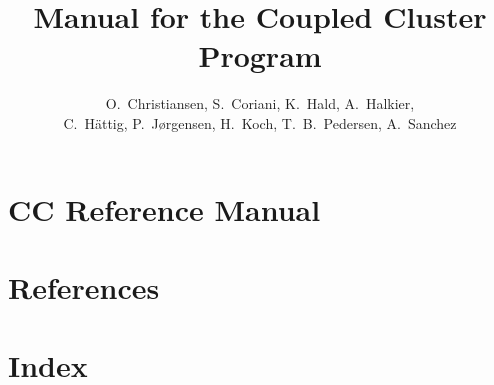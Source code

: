 \documentclass[12pt]{report}
\begin{document}
%

%


\title{Manual for the Coupled Cluster Program}

\author{
O.~Christiansen,
S.~Coriani, 
K.~Hald,
A.~Halkier,
\\
C.~H{\"a}ttig, 
P.~J{\o}rgensen,
H.~Koch, 
T.~B.~Pedersen,
A.~Sanchez
}  

\maketitle

\tableofcontents


% 

%
%
% 
% 
%
%

% 
%
%
%
%
\part{CC Reference Manual}

\newpage 
\newpage 
\newpage 
\newpage 
\newpage 
\newpage 
\newpage 
\newpage 
\newpage 
\newpage 
\newpage 
\newpage 
\newpage 
\newpage 
\newpage 
\newpage 
\part{References}

\part{Index}
\printindex
\end{document}

